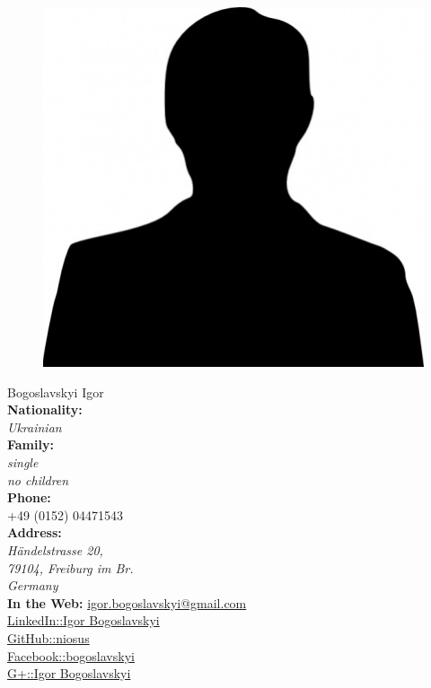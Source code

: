 \documentclass[a4paper,12pt,final]{memoir}
\newcommand{\SmallSep}{\vspace{0.5em}}
\begin{document}
\begin{figure}
	\hfill
	\includegraphics[width=0.6\columnwidth]{photo.jpg}
	\vspace{-6cm}
\end{figure}

\begin{flushright}\small
	Bogoslavskyi Igor\\
	\textbf{Nationality:} \emph{\\Ukrainian\\}
	\textbf{Family:} \emph{\\single \\no children\\}
	\SmallSep
	\textbf{Phone:}\\
	+49 (0152) 04471543\\
	\textbf{Address:}\\ \emph{H\"{a}ndelstrasse 20, \\79104, Freiburg im Br. \\Germany}\\
	\SmallSep
	\textbf{In the Web:}
	\href{mailto:igor.bogoslavskyi@gmail.com}{igor.bogoslavskyi@gmail.com}\\ 
	\SmallSep
	\href{http://www.linkedin.com/pub/igor-bogoslavskyi/43/50b/726}{LinkedIn::Igor Bogoslavskyi}\\ 
	\SmallSep
	\href{https://github.com/niosus}{GitHub::niosus}\\
	\SmallSep
	\href{https://www.facebook.com/bogoslavskyi}{Facebook::bogoslavskyi}\\ 
	\SmallSep
	\href{https://plus.google.com/118159072920638602239/posts}{G+::Igor Bogoslavskyi}\\ 
	\SmallSep
\end{flushright}\normalsize
\framebreak
\end{document}
